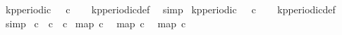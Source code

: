 \begin{isabellebody}
\isanewline
{}\isamarkupfalse%
\ {\isacartoucheopen}kp{\isacharunderscore}periodic\ {}\ {}\ c{}{\isacartoucheclose}\isanewline
%
\isadelimproof
\ \ %
\endisadelimproof
%
\isatagproof
{}\isamarkupfalse%
\ kp{\isacharunderscore}periodic{\isacharunderscore}def\ \isamarkupfalse%
\ simp%
\endisatagproof
{\isafoldproof}%
%
\isadelimproof
\isanewline
%
\endisadelimproof
\isanewline
{}\isamarkupfalse%
\ {\isacartoucheopen}kp{\isacharunderscore}periodic\ {}\ {}\ c{}{\isacartoucheclose}\isanewline
%
\isadelimproof
\ \ %
\endisadelimproof
%
\isatagproof
{}\isamarkupfalse%
\ kp{\isacharunderscore}periodic{\isacharunderscore}def\ \isamarkupfalse%
\ simp%
\endisatagproof
{\isafoldproof}%
%
\isadelimproof
\isanewline
%
\endisadelimproof
\isanewline
{}\isamarkupfalse%
\ {\isacartoucheopen}c{}\ {\isasymequiv}\ c{}\ {\isasymoplus}\ c{}{\isacartoucheclose}\isanewline
\isanewline
{}\isamarkupfalse%
\ {\isacartoucheopen}map\ c{}\ {\isacharbrackleft}{}{\isacharcomma}{}{\isacharcomma}{}{\isacharcomma}{}{\isacharcomma}{}{\isacharcomma}{}{\isacharcomma}{}{\isacharcomma}{}{\isacharcomma}{}{\isacharcomma}{}{\isacharcomma}{}{}{\isacharbrackright}{\isacartoucheclose}\isanewline
{}\isamarkupfalse%
\ {\isacartoucheopen}map\ {\isacharparenleft}{\isachardollar}c{}{\isacharparenright}\ {\isacharbrackleft}{}{\isacharcomma}{}{\isacharcomma}{}{\isacharcomma}{}{\isacharcomma}{}{\isacharcomma}{}{\isacharcomma}{}{\isacharcomma}{}{\isacharcomma}{}{\isacharcomma}{}{\isacharcomma}{}{}{\isacharcomma}{}{}{\isacharbrackright}{\isacartoucheclose}\isanewline
{}\isamarkupfalse%
\ {\isacartoucheopen}map\ c{}\ {\isacharbrackleft}{}{\isacharcomma}{}{\isacharcomma}{}{\isacharcomma}{}{\isacharcomma}{}{\isacharcomma}{}{\isacharcomma}{}{\isacharcomma}{}{\isacharcomma}{}{\isacharcomma}{}{\isacharcomma}{}{}{\isacharbrackright}{\isacartoucheclose}\isanewline
{}\isamarkupfalse%

\end{isabellebody}
